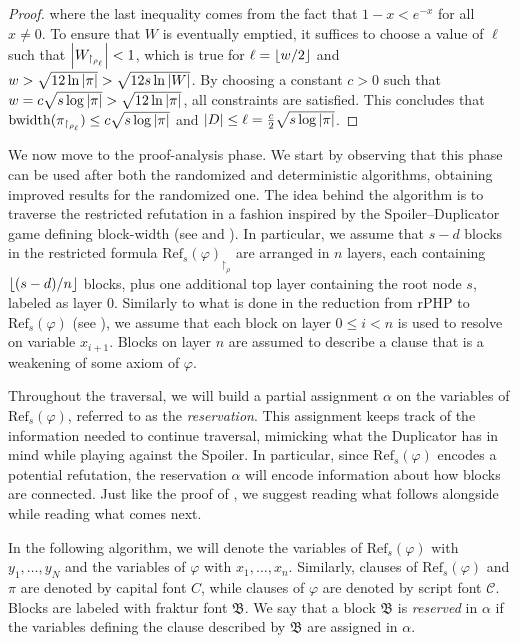 \begin{proof}
    \noindent
    where the last inequality comes from the fact that $1-x < e^{-x}$ for all $x \neq 0$. To ensure that $W$ is eventually emptied, it suffices to choose a value of $\ell$ such that $\left|W_{\upharpoonright_{\rho_\ell}}\right| < 1$, which is true for $\ell = \left \lfloor w/2 \right \rfloor$ and $w > \sqrt{12 \ln \left|\pi\right|} > \sqrt{12s \ln \left|W\right|}$. By choosing a constant $c > 0$ such that $w = c \sqrt{s \log \left|\pi\right|} > \sqrt{12 \ln \left|\pi\right|}$, all constraints are satisfied. This concludes that $\mathrm{bwidth}(\pi_{\upharpoonright_{\rho_\ell}}) \leq c \sqrt{s \log \left|\pi\right|}$ and $\left|D\right| \leq \ell = \frac{c}{2} \sqrt{s \log \left|\pi\right|}$.
\end{proof}

We now move to the proof-analysis phase. We start by observing that this phase can be used after both the randomized and deterministic algorithms, obtaining improved results for the randomized one. The idea behind the algorithm is to traverse the restricted refutation in a fashion inspired by the Spoiler--Duplicator game defining block-width (see  and ). In particular, we assume that $s-d$ blocks in the restricted formula $\mathrm{Ref}_{s}(\varphi)_{\upharpoonright_\rho}$ are arranged in $n$ layers, each containing $\left \lfloor (s-d)/n \right \rfloor$ blocks, plus one additional top layer containing the root node $s$, labeled as layer 0. Similarly to what is done in the reduction from $\mathrm{rPHP}$ to $\mathrm{Ref}_s(\varphi)$ (see ), we assume that each block on layer $0 \leq i < n$ is used to resolve on variable $x_{i+1}$. Blocks on layer $n$ are assumed to describe a clause that is a weakening of some axiom of $\varphi$.

Throughout the traversal, we will build a partial assignment $\alpha$ on the variables of $\mathrm{Ref}_s(\varphi)$, referred to as the \textit{reservation}. This assignment keeps track of the information needed to continue traversal, mimicking what the Duplicator has in mind while playing against the Spoiler. In particular, since $\mathrm{Ref}_s(\varphi)$ encodes a potential refutation, the reservation $\alpha$ will encode information about how blocks are connected. Just like the proof of , we suggest reading what follows alongside  while reading what comes next.

In the following algorithm, we will denote the variables of $\mathrm{Ref}_s(\varphi)$ with $y_1, \ldots, y_N$ and the variables of $\varphi$ with $x_1, \ldots, x_n$. Similarly, clauses of $\mathrm{Ref}_s(\varphi)$ and $\pi$ are denoted by capital font $C$, while clauses of $\varphi$ are denoted by script font $\mathscr{C}$. Blocks are labeled with fraktur font $\mathfrak{B}$. We say that a block $\mathfrak{B}$ is \textit{reserved} in $\alpha$ if the variables defining the clause described by $\mathfrak{B}$ are assigned in $\alpha$.

